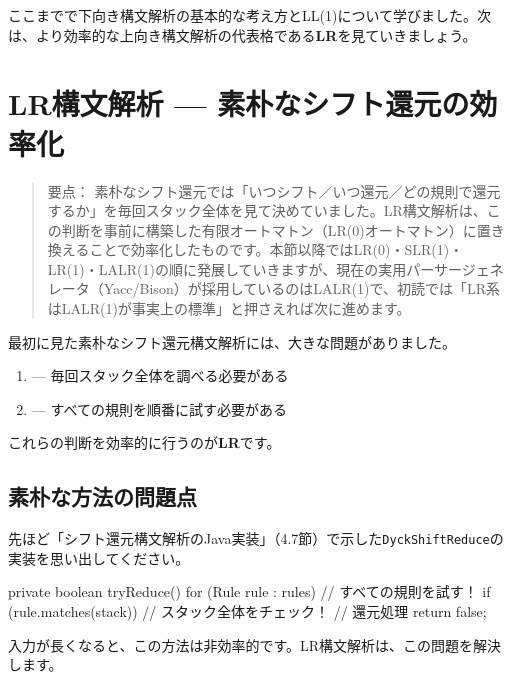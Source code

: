 ここまでで下向き構文解析の基本的な考え方とLL(1)について学びました。次は、より効率的な上向き構文解析の代表格である\textbf{\sffamily LR}を見ていきましょう。

\section{LR構文解析 --- 素朴なシフト還元の効率化}

\begin{quote}
要点：
素朴なシフト還元では「いつシフト／いつ還元／どの規則で還元するか」を毎回スタック全体を見て決めていました。LR構文解析は、この判断を事前に構築した有限オートマトン（LR(0)オートマトン）に置き換えることで効率化したものです。本節以降ではLR(0)・SLR(1)・LR(1)・LALR(1)の順に発展していきますが、現在の実用パーサージェネレータ（Yacc/Bison）が採用しているのはLALR(1)で、初読では「LR系はLALR(1)が事実上の標準」と押さえれば次に進めます。
\end{quote}

最初に見た素朴なシフト還元構文解析には、大きな問題がありました。

\begin{enumerate}
\item
   ---
  毎回スタック全体を調べる必要がある
\item
   --- すべての規則を順番に試す必要がある
\end{enumerate}

これらの判断を効率的に行うのが\textbf{\sffamily LR}です。

\subsection{素朴な方法の問題点}

先ほど「シフト還元構文解析のJava実装」（4.7節）で示した\texttt{DyckShiftReduce}の実装を思い出してください。

\begin{codescreen}{}
private boolean tryReduce() {
    for (Rule rule : rules) {  // すべての規則を試す！
        if (rule.matches(stack)) {  // スタック全体をチェック！
            // 還元処理
        }
    }
    return false;
}
\end{codescreen}

入力が長くなると、この方法は非効率的です。LR構文解析は、この問題を解決します。


